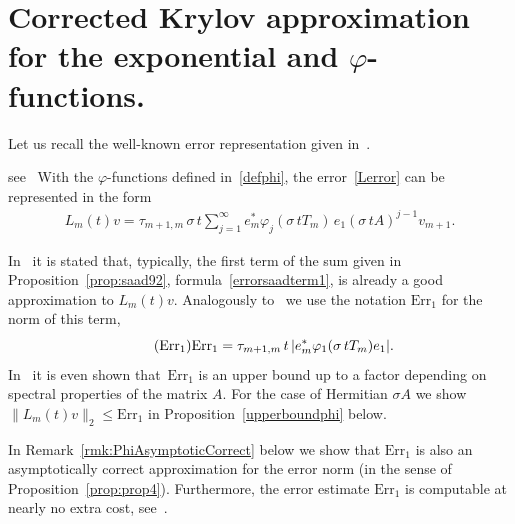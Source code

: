\documentclass[smallextended]{svjour3pre}%
\numberwithin{equation}{section}
\numberwithin{figure}{section}
\numberwithin{table}{section}
\newcommand\phif\varphi
\newcommand\Erone{\mathrm{Err}_1}
\newcommand\sca{\sigma}
\newcommand\Opgen{A}
\begin{document}
\section{Corrected Krylov approximation for the exponential and $\phif$-functions.}
\label{sec:saadest}




Let us recall the well-known error representation given in~\cite{saad92s}.
\begin{proposition}{{\rm{see~\cite[Theorem 5.1]{saad92s}}}}\label{prop:saad92}
With the $\phif$-functions defined in~\eqref{defphi},
the error~\eqref{Lerror} can be represented in the form
\begin{align}\label{sumofsaad}
L_m(t)v =
 \tau_{m+1,m}\,\sca\,t
  \sum_{j=1}^{\infty} e_m^\ast\phif_{j}(\sca\,tT_m)\,e_1 (\sca\,t \Opgen)^{j-1}v_{m+1}.
\end{align}
\end{proposition}

In~\cite{saad92s} it is stated that, typically,
the first term of the sum given in
Proposition~\ref{prop:saad92}, formula~\eqref{errorsaadterm1},
is already a good approximation to $L_m(t)v$.
Analogously to~\cite[Section 5.2]{saad92s}
we use the notation $\Erone$
for the norm of this term,
\begin{equation}\label{errorsaadterm1}\tag{$\Erone$}
\Erone = \tau_{m+1,m}\,t\,|e_m^\ast\phif_1(\sca\,t T_m)e_1|.
\end{equation}
In~\cite{chinesen17} it is even shown
that~$\Erone$ is an upper bound up
to a factor depending on spectral properties of the matrix $\Opgen$.
For the case of Hermitian $\sca\Opgen$ we show $\|L_m(t)v\|_2 \leq \Erone$ in Proposition~\ref{upperboundphi} below.

In Remark~\ref{rmk:PhiAsymptoticCorrect} below we show that $\Erone$ is also an asymptotically correct
approximation for the error norm
(in the sense of Proposition~\ref{prop:prop4}).
Furthermore, the error estimate $\Erone$ is computable at nearly no extra cost,
see~\cite[Proposition~2.1]{saad92s}.
\end{document}
